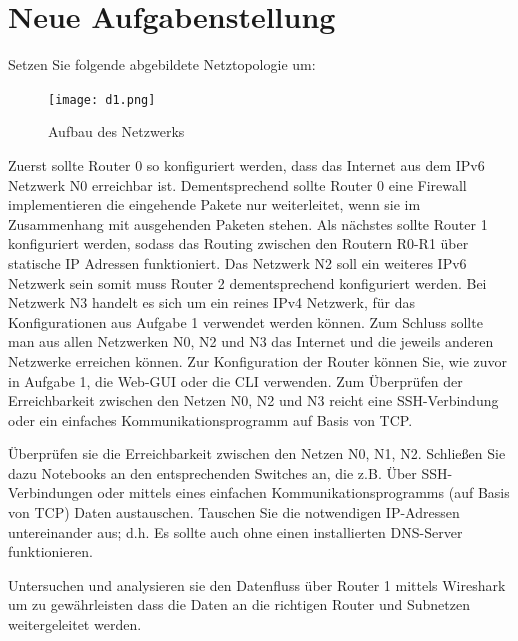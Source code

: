 \documentclass[11pt,a4paper]{article}
\begin{document}
\section{Neue Aufgabenstellung}

Setzen Sie folgende abgebildete Netztopologie um:\\
\begin{figure}[ht]
	\texttt{[image: d1.png]}
	\centering
	\caption{Aufbau des Netzwerks}
\end{figure}
\par
Zuerst sollte Router 0 so konfiguriert werden, dass das Internet aus dem IPv6 Netzwerk N0 erreichbar ist. Dementsprechend sollte Router 0 eine Firewall implementieren die eingehende Pakete nur weiterleitet, wenn sie im Zusammenhang mit ausgehenden Paketen stehen. Als nächstes sollte Router 1 konfiguriert werden, sodass das Routing zwischen den Routern R0-R1 über statische IP Adressen funktioniert. Das Netzwerk N2 soll ein weiteres IPv6 Netzwerk sein somit muss Router 2 dementsprechend konfiguriert werden. Bei Netzwerk N3 handelt es sich um ein reines IPv4 Netzwerk, für das Konfigurationen aus Aufgabe 1 verwendet werden können. Zum Schluss sollte man aus allen Netzwerken N0, N2 und N3 das Internet und die jeweils anderen Netzwerke erreichen können. Zur Konfiguration der Router können Sie, wie zuvor in Aufgabe 1, die Web-GUI oder die CLI verwenden. Zum Überprüfen der Erreichbarkeit zwischen den Netzen N0, N2 und N3 reicht eine SSH-Verbindung oder ein einfaches Kommunikationsprogramm auf Basis von TCP.

\par
Überprüfen sie die Erreichbarkeit zwischen den Netzen N0, N1, N2. Schließen Sie dazu Notebooks an den entsprechenden Switches an, die z.B. Über SSH-Verbindungen oder mittels eines einfachen Kommunikationsprogramms (auf Basis von TCP) Daten austauschen. Tauschen Sie die notwendigen IP-Adressen untereinander aus; d.h. Es sollte auch ohne einen installierten DNS-Server funktionieren.

\par

Untersuchen und analysieren sie den Datenfluss über Router 1 mittels Wireshark um zu gewährleisten dass die Daten an die richtigen Router und Subnetzen weitergeleitet werden.
\end{document}
